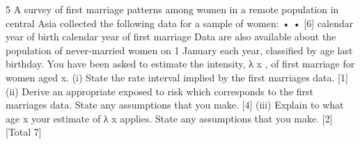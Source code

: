 \documentclass[a4paper,12pt]{article}
\begin{document}
\begin{enumerate}


5 A survey of first marriage patterns among women in a remote population in central
Asia collected the following data for a sample of women:
•
•
[6]
calendar year of birth
calendar year of first marriage
Data are also available about the population of never-married women on 1 January
each year, classified by age last birthday.
You have been asked to estimate the intensity, λ x , of first marriage for women
aged x.
(i) State the rate interval implied by the first marriages data. [1]
(ii) Derive an appropriate exposed to risk which corresponds to the first
marriages data. State any assumptions that you make. [4]
(iii)
Explain to what age x your estimate of λ x applies. State any assumptions
that you make.
[2]
[Total 7]








\end{enumerate}
\end{document}
